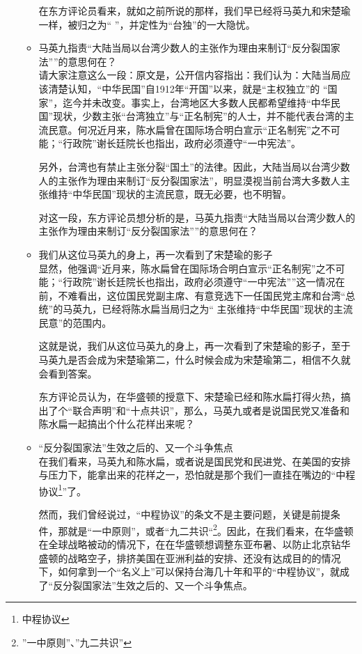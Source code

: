\documentclass[a4paper,11pt]{article}
\begin{document}
\begin{itemize}
\begin{itemize}
    在东方评论员看来，就如之前所说的那样，我们早已经将马英九和宋楚瑜一样，被归之为“
    ”，并定性为“台独”的一大隐忧。
 

\item 马英九指责“大陆当局以台湾少数人的主张作为理由来制订“反分裂国家法””的意思何在？\\
\label{sec-2_3_5}%
请大家注意这么一段：原文是，公开信内容指出：我们认为：大陆当局应该清楚认知，“中华民国”自1912年“开国”以来，就是“主权独立”的 “国家”，迄今并未改变。事实上，台湾地区大多数人民都希望维持“中华民国”现状，少数主张“台湾独立”与“正名制宪”的人士，并不能代表台湾的主流民意。何况近月来，陈水扁曾在国际场合明白宣示“正名制宪”之不可能；“行政院”谢长廷院长也指出，政府必须遵守“一中宪法”。

    另外，台湾也有禁止主张分裂“国土”的法律。因此，大陆当局以台湾少数人的主张作为理由来制订“反分裂国家法”，明显漠视当前台湾大多数人主张维持“中华民国”现状的主流民意，既无必要，也不明智。

    对这一段，东方评论员想分析的是，马英九指责“大陆当局以台湾少数人的主张作为理由来制订“反分裂国家法””的意思何在？
 

\item 我们从这位马英九的身上，再一次看到了宋楚瑜的影子\\
\label{sec-2_3_6}%
显然，他强调“近月来，陈水扁曾在国际场合明白宣示“正名制宪”之不可能；“行政院”谢长廷院长也指出，政府必须遵守“一中宪法””这一情况在前，不难看出，这位国民党副主席、有意竞选下一任国民党主席和台湾“总统”的马英九，已经将陈水扁当局归之为“ 主张维持“中华民国”现状的主流民意”的范围内。

    这就是说，我们从这位马英九的身上，再一次看到了宋楚瑜的影子，至于马英九是否会成为宋楚瑜第二，什么时候会成为宋楚瑜第二，相信不久就会看到答案。

    东方评论员认为，在华盛顿的授意下、宋楚瑜已经和陈水扁打得火热，搞出了个“联合声明”和“十点共识”，那么，马英九或者是说国民党又准备和陈水扁一起搞出个什么花样出来呢？
 

\item “反分裂国家法”生效之后的、又一个斗争焦点\\
\label{sec-2_3_7}%
在我们看来，马英九和陈水扁，或者说是国民党和民进党、在美国的安排与压力下，能拿出来的花样之一，恐怕就是那个我们一直挂在嘴边的“中程协议\footnote{中程协议 }”了。

    然而，我们曾经说过，“中程协议”的条文不是主要问题，关键是前提条件，那就是“一中原则”，或者“九二共识“\footnote{”一中原则''、''九二共识'' }。因此，在我们看来，在华盛顿在全球战略被动的情况下，在在华盛顿想调整东亚布暑、以防止北京钻华盛顿的战略空子，排挤美国在亚洲利益的安排、还没有达成目的的情况下，如何拿到一个“名义上”可以保持台海几十年和平的“中程协议”，就成了“反分裂国家法”生效之后的、又一个斗争焦点。
 


\end{itemize}
\end{itemize}
\end{document}
